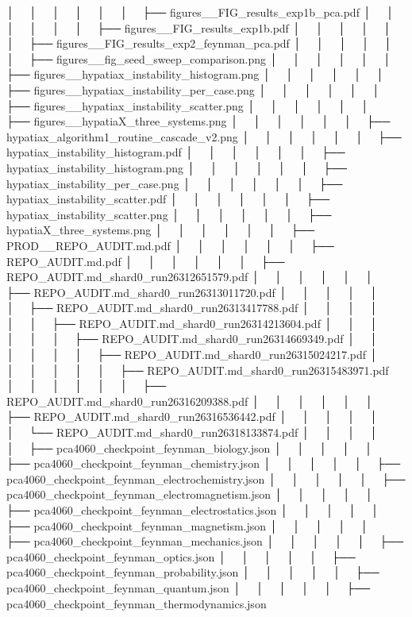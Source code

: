 │   │       │   │   │   │   ├── figures__FIG_results_exp1b_pca.pdf
│   │       │   │   │   │   ├── figures__FIG_results_exp1b.pdf
│   │       │   │   │   │   ├── figures__FIG_results_exp2_feynman_pca.pdf
│   │       │   │   │   │   ├── figures__fig_seed_sweep_comparison.png
│   │       │   │   │   │   ├── figures__hypatiax_instability_histogram.png
│   │       │   │   │   │   ├── figures__hypatiax_instability_per_case.png
│   │       │   │   │   │   ├── figures__hypatiax_instability_scatter.png
│   │       │   │   │   │   ├── figures__hypatiaX_three_systems.png
│   │       │   │   │   │   ├── hypatiax_algorithm1_routine_cascade_v2.png
│   │       │   │   │   │   ├── hypatiax_instability_histogram.pdf
│   │       │   │   │   │   ├── hypatiax_instability_histogram.png
│   │       │   │   │   │   ├── hypatiax_instability_per_case.png
│   │       │   │   │   │   ├── hypatiax_instability_scatter.pdf
│   │       │   │   │   │   ├── hypatiax_instability_scatter.png
│   │       │   │   │   │   ├── hypatiaX_three_systems.png
│   │       │   │   │   │   ├── PROD__REPO_AUDIT.md.pdf
│   │       │   │   │   │   ├── REPO_AUDIT.md.pdf
│   │       │   │   │   │   ├── REPO_AUDIT.md_shard0_run26312651579.pdf
│   │       │   │   │   │   ├── REPO_AUDIT.md_shard0_run26313011720.pdf
│   │       │   │   │   │   ├── REPO_AUDIT.md_shard0_run26313417788.pdf
│   │       │   │   │   │   ├── REPO_AUDIT.md_shard0_run26314213604.pdf
│   │       │   │   │   │   ├── REPO_AUDIT.md_shard0_run26314669349.pdf
│   │       │   │   │   │   ├── REPO_AUDIT.md_shard0_run26315024217.pdf
│   │       │   │   │   │   ├── REPO_AUDIT.md_shard0_run26315483971.pdf
│   │       │   │   │   │   ├── REPO_AUDIT.md_shard0_run26316209388.pdf
│   │       │   │   │   │   ├── REPO_AUDIT.md_shard0_run26316536442.pdf
│   │       │   │   │   │   └── REPO_AUDIT.md_shard0_run26318133874.pdf
│   │       │   │   │   ├── pca4060_checkpoint_feynman_biology.json
│   │       │   │   │   ├── pca4060_checkpoint_feynman_chemistry.json
│   │       │   │   │   ├── pca4060_checkpoint_feynman_electrochemistry.json
│   │       │   │   │   ├── pca4060_checkpoint_feynman_electromagnetism.json
│   │       │   │   │   ├── pca4060_checkpoint_feynman_electrostatics.json
│   │       │   │   │   ├── pca4060_checkpoint_feynman_magnetism.json
│   │       │   │   │   ├── pca4060_checkpoint_feynman_mechanics.json
│   │       │   │   │   ├── pca4060_checkpoint_feynman_optics.json
│   │       │   │   │   ├── pca4060_checkpoint_feynman_probability.json
│   │       │   │   │   ├── pca4060_checkpoint_feynman_quantum.json
│   │       │   │   │   ├── pca4060_checkpoint_feynman_thermodynamics.json
